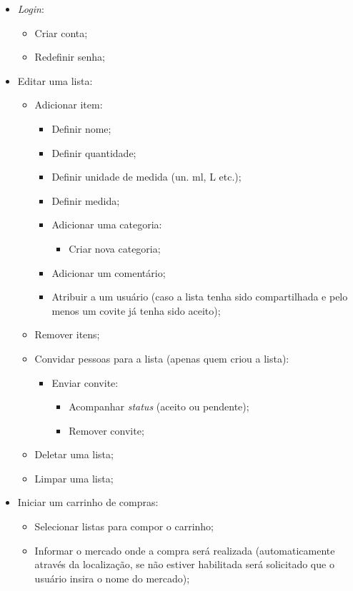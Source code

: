 \begin{itemize}
	\item \textit{Login}:
		\begin{itemize}
			\item Criar conta;
			\item Redefinir senha;
		\end{itemize}
	\item Editar uma lista:
		\begin{itemize}
			\item Adicionar item:
				\begin{itemize}
					\item Definir nome;
					\item Definir quantidade;
					\item Definir unidade de medida (un. ml, L etc.);
					\item Definir medida;
					\item Adicionar uma categoria:
						\begin{itemize}
							\item Criar nova categoria;
						\end{itemize}
					\item Adicionar um comentário;
					\item Atribuir a um usuário (caso a lista tenha sido compartilhada e pelo menos um covite já tenha sido aceito);
				\end{itemize}
			\item Remover itens;
			\item Convidar pessoas para a lista (apenas quem criou a lista):
				\begin{itemize}
					\item Enviar convite:
						\begin{itemize}
							\item Acompanhar \textit{status} (aceito ou pendente);
							\item Remover convite;
						\end{itemize}
				\end{itemize}
			\item Deletar uma lista;
			\item Limpar uma lista;
		\end{itemize}
	\item Iniciar um carrinho de compras:
		\begin{itemize}
			\item Selecionar listas para compor o carrinho;
			\item Informar o mercado onde a compra será realizada (automaticamente através da localização, se não estiver habilitada será solicitado que o usuário insira o nome do mercado);

\end{itemize}
\end{itemize}
